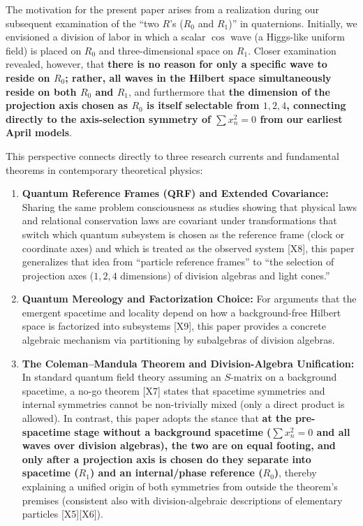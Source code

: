 \documentclass[
  a4paper,
]{article}
\providecommand{\tightlist}{%
  \setlength{\itemsep}{0pt}\setlength{\parskip}{0pt}}
\begin{document}
The motivation for the present paper arises from a realization during
our subsequent examination of the ``two \(R\)'s (\(R_0\) and \(R_1\))''
in quaternions. Initially, we envisioned a division of labor in which a
scalar \(\cos\) wave (a Higgs-like uniform field) is placed on \(R_0\)
and three-dimensional space on \(R_1\). Closer examination revealed,
however, that \textbf{there is no reason for only a specific wave to
reside on \(R_0\); rather, all waves in the Hilbert space simultaneously
reside on both \(R_0\) and \(R_1\)}, and furthermore that \textbf{the
dimension of the projection axis chosen as \(R_0\) is itself selectable
from \(1, 2, 4\), connecting directly to the axis-selection symmetry of
\(\sum x_n^2 = 0\) from our earliest April models}.

This perspective connects directly to three research currents and
fundamental theorems in contemporary theoretical physics:

\begin{enumerate}
\def\labelenumi{\arabic{enumi}.}
\tightlist
\item
  \textbf{Quantum Reference Frames (QRF) and Extended Covariance:}
  Sharing the same problem consciousness as studies showing that
  physical laws and relational conservation laws are covariant under
  transformations that switch which quantum subsystem is chosen as the
  reference frame (clock or coordinate axes) and which is treated as the
  observed system {[}X8{]}, this paper generalizes that idea from
  ``particle reference frames'' to ``the selection of projection axes
  (\(1, 2, 4\) dimensions) of division algebras and light cones.''
\item
  \textbf{Quantum Mereology and Factorization Choice:} For arguments
  that the emergent spacetime and locality depend on how a
  background-free Hilbert space is factorized into subsystems {[}X9{]},
  this paper provides a concrete algebraic mechanism via partitioning by
  subalgebras of division algebras.
\item
  \textbf{The Coleman--Mandula Theorem and Division-Algebra
  Unification:} In standard quantum field theory assuming an
  \(S\)-matrix on a background spacetime, a no-go theorem {[}X7{]}
  states that spacetime symmetries and internal symmetries cannot be
  non-trivially mixed (only a direct product is allowed). In contrast,
  this paper adopts the stance that \textbf{at the pre-spacetime stage
  without a background spacetime (\(\sum x_n^2 = 0\) and all waves over
  division algebras), the two are on equal footing, and only after a
  projection axis is chosen do they separate into spacetime (\(R_1\))
  and an internal/phase reference (\(R_0\))}, thereby explaining a
  unified origin of both symmetries from outside the theorem's premises
  (consistent also with division-algebraic descriptions of elementary
  particles {[}X5{]}{[}X6{]}).
\end{enumerate}
\end{document}
